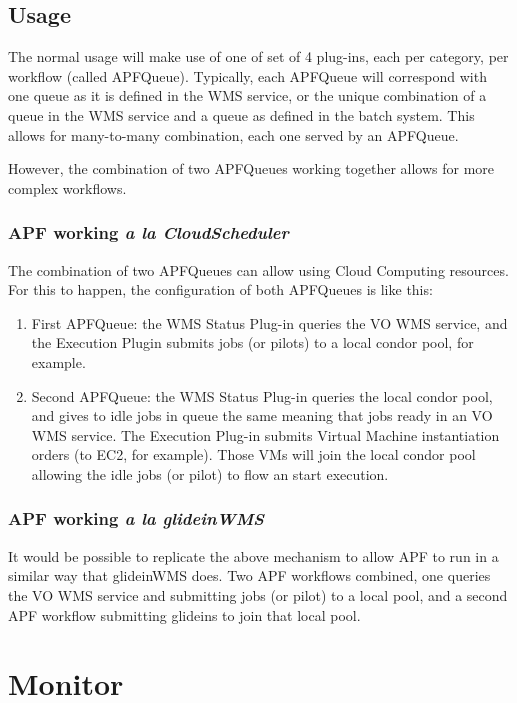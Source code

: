 \documentclass[a4paper]{jpconf}
\begin{document}
\subsection{Usage}

The normal usage will make use of one of set of 4 plug-ins, each per category, per workflow (called APFQueue). 
Typically, each APFQueue will correspond with one queue as it is defined in the WMS service, 
or the unique combination of a queue in the WMS service and a queue as defined in the batch system. 
This allows for many-to-many combination, each one served by an APFQueue. 

However, the combination of two APFQueues working together allows for more complex workflows.

\subsubsection{APF working \emph{a la CloudScheduler}}

The combination of two APFQueues can allow using Cloud Computing resources. 
For this to happen, the configuration of both APFQueues is like this:

\begin{enumerate}
\item First APFQueue: 
the WMS Status Plug-in queries the VO WMS service, and the Execution Plugin submits jobs (or pilots) to a local condor pool, for example.
\item Second APFQueue: 
the WMS Status Plug-in queries the local condor pool, 
and gives to idle jobs in queue the same meaning that jobs ready in an VO WMS service. 
The Execution Plug-in submits Virtual Machine instantiation orders (to EC2, for example). 
Those VMs will join the local condor pool allowing the idle jobs (or pilot) to flow an start execution. 
\end{enumerate}

\subsubsection{APF working \emph{a la glideinWMS}}

It would be possible to replicate the above mechanism to allow APF to run in a similar way that glideinWMS does. 
Two APF workflows combined, one queries the VO WMS service and submitting jobs (or pilot) to a local pool, 
and a second APF workflow submitting glideins to join that local pool. 

\section{Monitor}
\end{document}
